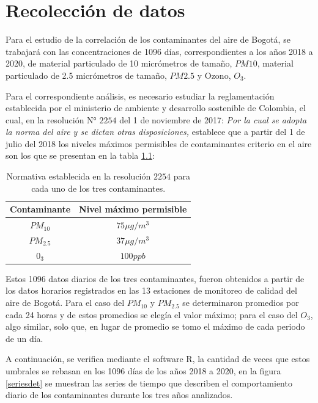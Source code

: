 \chapter{Recolección de datos} 

Para el estudio de la correlación de los contaminantes del aire de Bogotá, se trabajará con las concentraciones de 1096 días, correspondientes a los años 2018 a 2020, de material particulado de 10 micrómetros de tamaño, $PM 10$, material particulado de 2.5 micrómetros de tamaño, $PM 2.5$ y Ozono, $O_3$. 


Para el correspondiente análisis, es necesario estudiar la reglamentación establecida por el ministerio de ambiente y desarrollo sostenible de Colombia, el cual, en la resolución N° $2254$ del 1 de noviembre de 2017: \textit{Por la cual se adopta la norma del aire y se dictan otras disposiciones,} establece que a partir del 1 de julio del 2018 los niveles máximos permisibles de contaminantes criterio en el aire son los que se presentan en la tabla \ref{nivelesperm}:
\begin{table}[!h]
\begin{center}
\begin{tabular}{|c|c|}
\hline
Contaminante & Nivel máximo permisible \\
\hline \hline
$PM_{10}$ &$ 75\mu g /m^3$ \\ \hline
$PM_{2.5}$ & $ 37 \mu g /m^3$  \\ \hline
$0_3$ & $100 ppb$ \\\hline
\end{tabular}
\caption{Normativa establecida en la resolución $2254$ para cada uno de los tres contaminantes.}
\label{nivelesperm}
\end{center}
\end{table}

Estos 1096 datos diarios de los tres contaminantes, fueron obtenidos a partir de los datos horarios registrados en las 13 estaciones de monitoreo de calidad del aire de Bogotá. Para el caso del $PM_{10}$ y $PM_{2.5}$ se determinaron promedios por cada 24 horas y de estos promedios se elegía el valor máximo; para el caso del $O_3$, algo similar, solo que, en lugar de promedio se tomo el máximo de cada periodo de un día. 

A continuación, se verifica mediante el software R, la cantidad de veces que estos umbrales se rebasan en los 1096 días de los años 2018 a 2020, en la figura \ref{seriesdet} se muestran las series de tiempo que describen el comportamiento diario de los contaminantes durante los tres años analizados.

